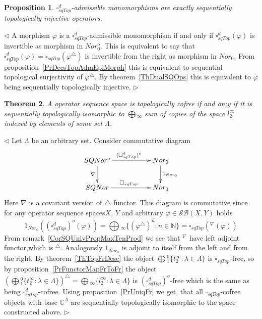 \documentclass[12pt]{article}
\newtheorem{theorem}{Theorem}[subsection]
\newtheorem{proposition}[theorem]{Proposition}
\newenvironment{proof}{\par $\triangleleft$}{$\triangleright$}
\begin{document}
\begin{proposition}\label{PrDecsTopAdmMonoMorph}
$\square_{sqTop}^d$-admissible monomorphisms are exactly sequentially 
topologically injective operators.
\end{proposition}
\begin{proof}
A morphism $\varphi$ is a $\square_{sqTop}^d$-admissible monomorphism if and 
only if $\square_{sqTop}^d(\varphi)$ is invertible as morphism in $Nor_0^o$. 
This is equivalent to say that 
$\square_{sqTop}^d(\varphi)=\square_{sqTop}(\varphi^\triangle)$ is invertible 
from the right as morphism in $Nor_0$. 
From proposition~\ref{PrDecsTopAdmEpiMorph} this is equivalent to sequential 
topological surjectivity of $\varphi^\triangle$. 
By theorem~\ref{ThDualSQOps} this is equivalent to $\varphi$ being 
sequentially topologically injective.
\end{proof}

\begin{theorem}\label{ThTopCoFrDesc}
A operator sequence space is topologically cofree if and on;y if it is 
sequentially topologically isomorphic to $\bigoplus{}_\infty$ sum of copies of 
the space $l_2^\infty$ indexed by elements of some set $\Lambda$.
\end{theorem}
\begin{proof}
Let $\Lambda$ be an arbitrary set. Consider commutative diagram
$$
\xymatrix{SQNor^o 
\ar[d]_{\nabla } \ar[rr]^{(\square_{sqTop}^d)^o} & & {Nor_0}  %
\ar[d]^{1_{Nor_0}} \\  %
SQNor\ar[rr]^{\square_{sqTop}} & & {Nor_0}}  %
$$
Here $\nabla$ is a covariant version of $\triangle$ functor.
This diagram is commutative since for any operator sequence spaces$X$, $Y$ 
and arbitrary $\varphi\in\mathcal{SB}(X,Y)$ holds
$$
1_{Nor_0}({(\square_{sqTop}^d)}^o(\varphi)) =\bigoplus{}_\infty
 \{{(\varphi^\triangle )}^{\wideparen{n}} : n \in \mathbb{N} \}
=\square_{sqTop}({}^\nabla(\varphi))
$$
From remark~\ref{CorSQUnivPropMaxTenProd} we see that ${}^\nabla$ have left 
adjoint functor,which is ${}^\triangle$. Analogously $1_{Nor_0}$ is adjoint to 
itself from the left and from the right. By theorem~\ref{ThTopFrDesc} 
the object $\bigoplus{}_1^0 \{t_2^\infty:\lambda\in\Lambda \}$ 
is $\square_{sqTop}$-free, so by proposition~\ref{PrFunctorMapFrToFr} the object 
${(\bigoplus{}_1^0 \{t_2^\infty:\lambda\in\Lambda \})}^\triangle
=\bigoplus{}_\infty \{l_2^\infty:\lambda\in\Lambda \}$ 
is ${(\square_{sqTop}^d)}^o$-free which is the same as 
being $\square_{sqTop}^d$-cofree. Using proposition~\ref{PrUniqFr} we get, 
that all $\square_{sqTop}$-cofree objects with base 
$\mathbb{C}^\Lambda$ are sequentially topologically isomorphic to the 
space constructed above.
\end{proof}
\end{document}
